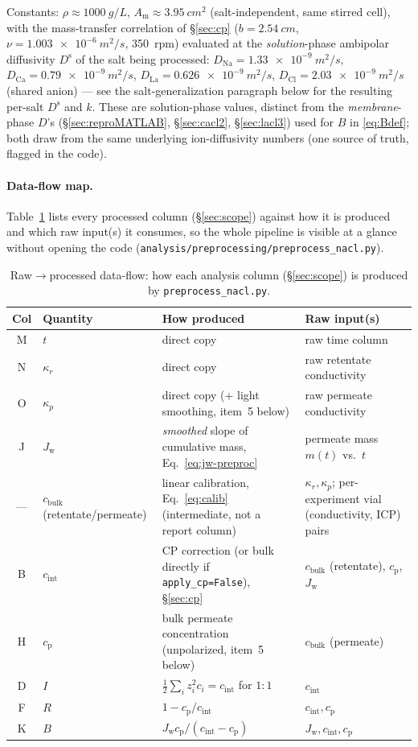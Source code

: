 \documentclass[11pt]{article}
\newcommand{\Jw}{J_{\mathrm{w}}}
\newcommand{\cint}{c_{\mathrm{int}}}
\newcommand{\cp}{c_{\mathrm{p}}}
\begin{document}
Constants: $\rho\approx\SI{1000}{g/L}$, $A_{\mathrm m}\approx\SI{3.95}{cm^2}$
(salt-independent, same stirred cell), with the mass-transfer correlation of
\S\ref{sec:cp} ($b=\SI{2.54}{cm}$, $\nu=\SI{1.003e-6}{m^2/s}$, \SI{350}{rpm})
evaluated at the \emph{solution}-phase ambipolar diffusivity $D^{\mathrm s}$ of
the salt being processed: $D_{\mathrm{Na}}=\SI{1.33e-9}{m^2/s}$,
$D_{\mathrm{Ca}}=\SI{0.79e-9}{m^2/s}$, $D_{\mathrm{La}}=\SI{0.626e-9}{m^2/s}$,
$D_{\mathrm{Cl}}=\SI{2.03e-9}{m^2/s}$ (shared anion) --- see the
salt-generalization paragraph below for the resulting per-salt $D^{\mathrm s}$
and $k$. These are solution-phase values, distinct from the \emph{membrane}-phase
$D$'s (\S\ref{sec:reproMATLAB}, \S\ref{sec:cacl2}, \S\ref{sec:lacl3}) used for $B$
in \eqref{eq:Bdef}; both draw from the same underlying ion-diffusivity numbers
(one source of truth, flagged in the code).

\paragraph{Data-flow map.} Table~\ref{tab:preprocflow} lists every processed
column (\S\ref{sec:scope}) against how it is produced and which raw input(s) it
consumes, so the whole pipeline is visible at a glance without opening the code
(\texttt{analysis/preprocessing/preprocess\_nacl.py}).

\begin{table}[H]
\centering\footnotesize
\begin{tabular}{c p{2.3cm} p{5.0cm} p{3.7cm}}
\toprule
Col & Quantity & How produced & Raw input(s) \\
\midrule
M & $t$ & direct copy & raw time column \\
N & $\kappa_r$ & direct copy & raw retentate conductivity \\
O & $\kappa_p$ & direct copy (+ light smoothing, item~5 below) & raw permeate conductivity \\
J & $\Jw$ & \emph{smoothed} slope of cumulative mass, Eq.~\ref{eq:jw-preproc} & permeate mass $m(t)$ vs.\ $t$ \\
--- & $c_{\mathrm{bulk}}$ (retentate/permeate) & linear calibration, Eq.~\ref{eq:calib} (intermediate, not a report column) & $\kappa_r,\kappa_p$; per-experiment vial (conductivity, ICP) pairs \\
B & $\cint$ & CP correction (or bulk directly if \texttt{apply\_cp=False}), \S\ref{sec:cp} & $c_{\mathrm{bulk}}$ (retentate), $\cp$, $\Jw$ \\
H & $\cp$ & bulk permeate concentration (unpolarized, item~5 below) & $c_{\mathrm{bulk}}$ (permeate) \\
D & $I$ & $\tfrac12\sum_i z_i^2c_i=\cint$ for $1{:}1$ & $\cint$ \\
F & $R$ & $1-\cp/\cint$ & $\cint,\cp$ \\
K & $B$ & $\Jw\cp/(\cint-\cp)$ & $\Jw,\cint,\cp$ \\
\bottomrule
\end{tabular}
\caption{Raw$\to$processed data-flow: how each analysis column
(\S\ref{sec:scope}) is produced by \texttt{preprocess\_nacl.py}.}
\label{tab:preprocflow}
\end{table}
\end{document}
